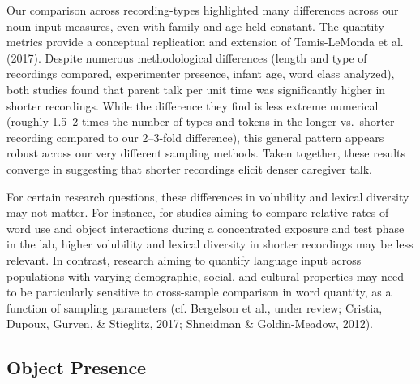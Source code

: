 \documentclass[man]{apa6}
\theoremstyle{definition}
\theoremstyle{definition}
\theoremstyle{definition}
\theoremstyle{remark}
\begin{document}
Our comparison across recording-types highlighted many differences
across our noun input measures, even with family and age held constant.
The quantity metrics provide a conceptual replication and extension of
Tamis-LeMonda et al. (2017). Despite numerous methodological differences
(length and type of recordings compared, experimenter presence, infant
age, word class analyzed), both studies found that parent talk per unit
time was significantly higher in shorter recordings. While the
difference they find is less extreme numerical (roughly 1.5--2 times the
number of types and tokens in the longer vs.~shorter recording compared
to our 2--3-fold difference), this general pattern appears robust across
our very different sampling methods. Taken together, these results
converge in suggesting that shorter recordings elicit denser caregiver
talk.

For certain research questions, these differences in volubility and
lexical diversity may not matter. For instance, for studies aiming to
compare relative rates of word use and object interactions during a
concentrated exposure and test phase in the lab, higher volubility and
lexical diversity in shorter recordings may be less relevant. In
contrast, research aiming to quantify language input across populations
with varying demographic, social, and cultural properties may need to be
particularly sensitive to cross-sample comparison in word quantity, as a
function of sampling parameters (cf. Bergelson et al., under review;
Cristia, Dupoux, Gurven, \& Stieglitz, 2017; Shneidman \& Goldin-Meadow,
2012).

\subsection{Object Presence}\label{object-presence}
\end{document}
